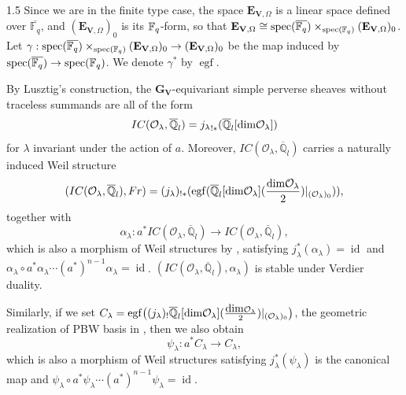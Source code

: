 \documentclass[10pt]{amsart}
\def\dim{\mbox{\rm dim}}   \def\End{\mbox{\rm End}}
\newcommand\mo{{\mathcal{O}}}
\begin{document}
\begin{spacing}{1.5}
Since we are in the finite type case, the space $\mathbf{E}_{\mathbf{V},\Omega}$ is a linear space defined over $\overline{\mathbb{F}_{q}}$, and $(\mathbf{E}_{\mathbf{V},\Omega})_0$ is its ${\mathbb F}_q$-form, so that $\mathbf{E}_{\mathbf{V},\Omega}\cong \operatorname{spec}(\overline{\mathbb{F}_{q}})\times_{\operatorname{spec}({\mathbb F}_q)}(\mathbf{E}_{\mathbf{V},\Omega})_0$. Let $\gamma:\operatorname{spec}(\overline{\mathbb{F}_{q}})\times_{\operatorname{spec}({\mathbb F}_q)}(\mathbf{E}_{\mathbf{V},\Omega})_0\rightarrow (\mathbf{E}_{\mathbf{V},\Omega})_0$ be the map induced by $\operatorname{spec}(\overline{\mathbb{F}_{q}})\rightarrow \operatorname{spec}({\mathbb F}_q)$. We denote $\gamma^*$ by $\operatorname{egf}$.

By Lusztig's construction, the $\mathbf{G}_{\mathbf{V}}$-equivariant simple perverse sheaves without traceless summands are all of the form
\[
IC(\mathcal{O}_{\lambda}, \overline{\mathbb{Q}}_l)={j_{\lambda}}_{!*}(\overline{\mathbb{Q}}_l[\dim \mo_{\lambda}])
\]
for $\lambda$ invariant under the action of $a$. Moreover, $IC(\mathcal{O}_{\lambda}, \overline{\mathbb{Q}}_l)$ carries a naturally induced Weil structure
\[
(IC(\mathcal{O}_{\lambda}, \overline{\mathbb{Q}}_l), Fr)=(j_\lambda)_{!*}(\operatorname{egf}(\overline{\mathbb{Q}}_l[\dim \mo_{\lambda}](\frac{\dim\mo_{\lambda}}{2})|_{(\mo_{\lambda})_0})),
\]
together with
\[
\alpha_{\lambda} : a^* IC(\mathcal{O}_{\lambda}, \overline{\mathbb{Q}}_l) \to IC(\mathcal{O}_{\lambda}, \overline{\mathbb{Q}}_l),
\]
which is also a morphism of Weil structures by \cite{lusztig1998canonical}, satisfying $j_{\lambda}^*(\alpha_{\lambda})=\operatorname{id}$ and $\alpha_{\lambda}\circ a^*\alpha_{\lambda}\cdots (a^*)^{n-1}\alpha_{\lambda}=\operatorname{id}$. $(IC(\mathcal{O}_{\lambda}, \overline{\mathbb{Q}}_l),\alpha_{\lambda})$ is stable under Verdier duality.

Similarly, if we set $C_{\lambda}=\operatorname{egf}\bigl((j_{\lambda})_! \overline{\mathbb{Q}}_l[\dim \mo_{\lambda}](\frac{\dim\mo_{\lambda}}{2}) |_{(\mathcal{O}_{\lambda})_0}\bigr)$, the geometric realization of PBW basis in \cite{lan2025structurecoefficientsquantumgroups}, then we also obtain
\[
\psi_{\lambda} : a^* C_{\lambda} \to C_{\lambda},
\]
which is also a morphism of Weil structures satisfying $j_{\lambda}^*(\psi_{\lambda})$ is the canonical map and $\psi_{\lambda}\circ a^*\psi_{\lambda}\cdots (a^*)^{n-1}\psi_{\lambda}=\operatorname{id}$. 


\end{spacing}
\end{document}
